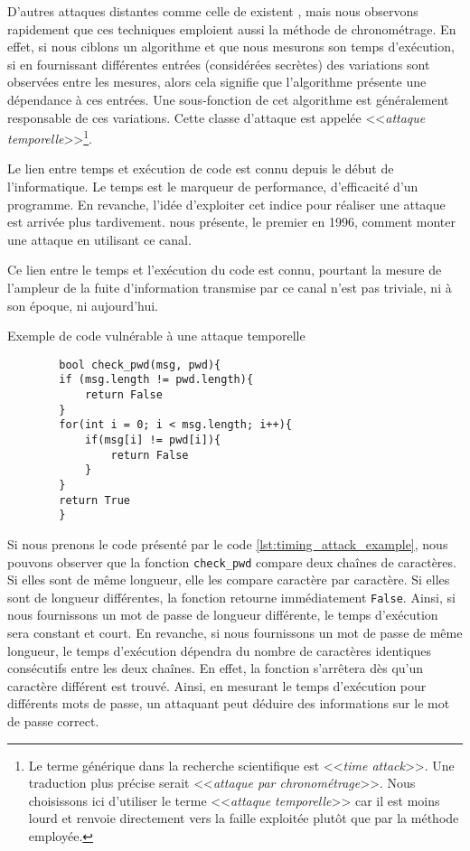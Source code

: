 D'autres attaques distantes comme celle de \citeauthor{LLC_attack} existent \cite{cryptoeprint:2016/224,Moghimi_2017,vanbulck2018nemesis}, mais nous observons rapidement que ces techniques emploient aussi la méthode de chronométrage. En effet, si nous ciblons un algorithme et que nous mesurons son temps d'exécution, si en fournissant différentes entrées (considérées secrètes) des variations sont observées entre les mesures, alors cela signifie que l'algorithme présente une dépendance à ces entrées. Une sous-fonction de cet algorithme est généralement responsable de ces variations. Cette classe d'attaque est appelée <<\textit{attaque temporelle}>>\footnote{Le terme générique dans la recherche scientifique est <<\textit{time attack}>>. Une traduction plus précise serait <<\textit{attaque par chronométrage}>>. Nous choisissons ici d'utiliser le terme <<\textit{attaque temporelle}>> car il est moins lourd et renvoie directement vers la faille exploitée plutôt que par la méthode employée.}.\medbreak

Le lien entre temps et exécution de code est connu depuis le début de l'informatique. Le temps est le marqueur de performance, d'efficacité d'un programme. En revanche, l'idée d'exploiter cet indice pour réaliser une attaque est arrivée plus tardivement. \citeauthor{crypto-1996-1469} nous présente, le premier en 1996, comment monter une attaque en utilisant ce canal.\medbreak

Ce lien entre le temps et l'exécution du code est connu, pourtant la mesure de l'ampleur de la fuite d'information transmise par ce canal n'est pas triviale, ni à son époque, ni aujourd'hui.

\begin{listing}[!ht]
    \caption{Exemple de code vulnérable à une attaque temporelle}
    \label{lst:timing_attack_example}
    \begin{verbatim}
        bool check_pwd(msg, pwd){
        if (msg.length != pwd.length){
            return False
        }
        for(int i = 0; i < msg.length; i++){
            if(msg[i] != pwd[i]){
                return False
            }
        }
        return True
        }
    \end{verbatim}
\end{listing}
                
Si nous prenons le code présenté par le code \ref{lst:timing_attack_example}, nous pouvons observer que la fonction \texttt{check\_pwd} compare deux chaînes de caractères. Si elles sont de même longueur, elle les compare caractère par caractère. Si elles sont de longueur différentes, la fonction retourne immédiatement \texttt{False}. Ainsi, si nous fournissons un mot de passe de longueur différente, le temps d'exécution sera constant et court. En revanche, si nous fournissons un mot de passe de même longueur, le temps d'exécution dépendra du nombre de caractères identiques consécutifs entre les deux chaînes. En effet, la fonction s'arrêtera dès qu'un caractère différent est trouvé. Ainsi, en mesurant le temps d'exécution pour différents mots de passe, un attaquant peut déduire des informations sur le mot de passe correct.\medbreak


